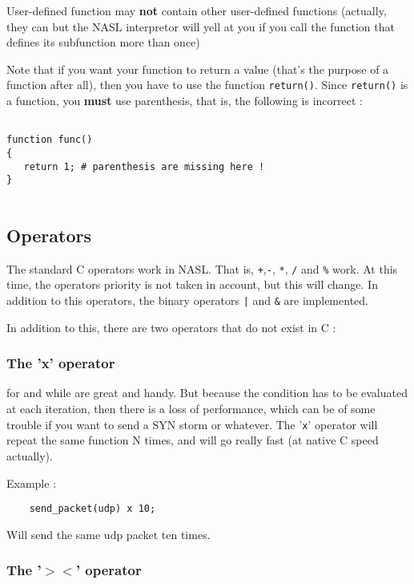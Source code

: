 \documentclass{article}
\begin{document}
User-defined function may \textbf{not} contain other user-defined functions (actually, they can but the NASL interpretor will yell at you if you call the function that defines its subfunction more than once)

  Note that if you want your function to return a value (that's the purpose of a function after all), then you have to use the function \verb+return()+. Since \verb+return()+ is a function, you \textbf{must} use parenthesis, that is, the following is incorrect :
  \begin{verbatim}

function func()
{
   return 1; # parenthesis are missing here !
}
  
\end{verbatim}
      

\subsection{Operators}

The standard C operators work in NASL. That is, \verb;+;,\verb+-+,
\verb+*+, \verb+/+ and \verb+%+ work. At this time, the operators priority
is not taken in account, but this will change. In addition to this
operators, the binary operators \verb+|+ and \verb+&+ are implemented.

In addition to this, there are two operators that do not exist in C :

\subsubsection{The 'x' operator}
	
for and while are great and handy. But because the condition
has to be evaluated at each iteration, then there is a loss
of performance, which can be of some trouble if you want
to send a SYN storm or whatever. The '\verb+x+' operator
will repeat the same function N times, and will go
really fast (at native C speed actually).

\noindent Example :
\begin{verbatim}
	send_packet(udp) x 10;
\end{verbatim}	

Will send the same udp packet ten times.	 


\subsubsection{The '$><$' operator}
\end{document}

